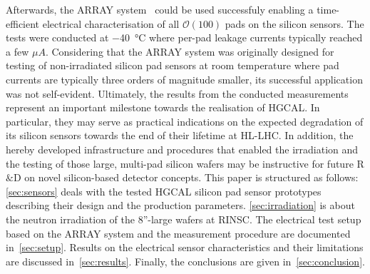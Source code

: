 Afterwards, the ARRAY system~\cite{pitters:array2019} could be used successfuly enabling a time-efficient electrical characterisation of all $\mathcal{O}(100)$ pads on the silicon sensors.
The tests were conducted at \SI{-40}{\celsius} where per-pad leakage currents typically reached a few $\mu A$.
Considering that the ARRAY system was originally designed for testing of non-irradiated silicon pad sensors at room temperature where pad currents are typically three orders of magnitude smaller, its successful application was not self-evident.
Ultimately, the results from the conducted measurements represent an important milestone towards the realisation of HGCAL.
In particular, they may serve as practical indications on the expected degradation of its silicon sensors towards the end of their lifetime at HL-LHC. 
In addition, the hereby developed infrastructure and procedures that enabled the irradiation and the testing of those large, multi-pad silicon wafers may be instructive for future R$\&$D on novel silicon-based detector concepts.
This paper is structured as follows:
\ref{sec:sensors} deals with the tested HGCAL silicon pad sensor prototypes describing their design and the production parameters.
\ref{sec:irradiation} is about the neutron irradiation of the 8''-large wafers at RINSC. 
The electrical test setup based on the ARRAY system and the measurement procedure are documented in~\ref{sec:setup}.
Results on the electrical sensor characteristics and their limitations are discussed in~\ref{sec:results}.
Finally, the conclusions are given in~\ref{sec:conclusion}.